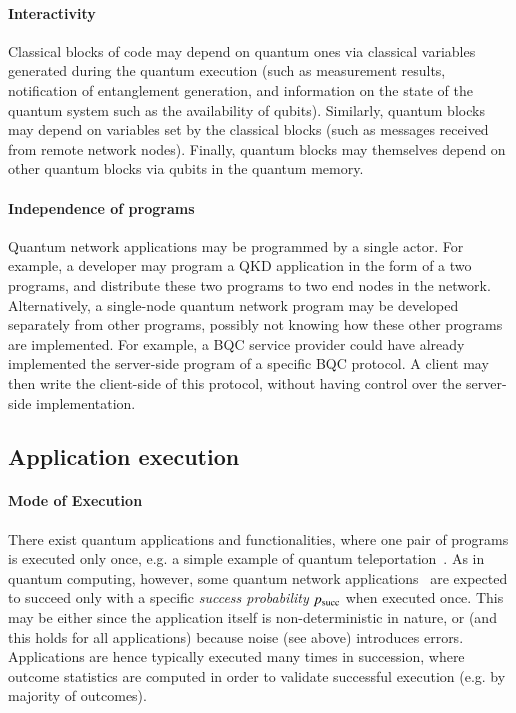 \paragraph{Interactivity}
Classical blocks of code may depend on quantum ones via classical variables generated during the quantum execution (such as measurement results, notification of entanglement generation, and information on the state of the quantum system such as the availability of qubits).
Similarly, quantum blocks may depend on variables set by the classical blocks (such as messages received from remote network nodes).
Finally, quantum blocks may themselves depend on other quantum blocks via qubits in the quantum memory. 


\paragraph{Independence of programs}
Quantum network applications may be programmed by a single actor.
For example, a developer may program a QKD application in the form of a two programs, and distribute these two programs to two end nodes in the network.
Alternatively, a single-node quantum network program may be developed separately from other programs, possibly not knowing how these other programs are implemented.
For example, a BQC service provider could have already implemented the server-side program of a specific BQC protocol.
A client may then write the client-side of this protocol, without having control over the server-side implementation.



\subsection{Application execution}

\paragraph{Mode of Execution}
There exist quantum applications and functionalities, where one pair of programs is executed only once, e.g. a simple example of quantum teleportation~\cite{bennett_1993_teleportation}.
As in quantum computing, however, some quantum network applications~\cite{wehner_2018_stages} are expected to succeed only with a specific \emph{success probability} $p_{\rm succ}$ when executed once.
This may be either since the application itself is non-deterministic in nature, or (and this holds for all applications) because noise (see above) introduces errors.
Applications are hence typically executed many times in succession, where outcome statistics are computed in order to validate successful execution (e.g. by majority of outcomes).

